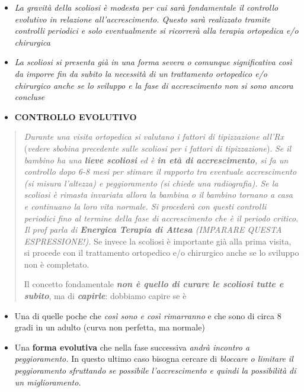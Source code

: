 \documentclass[]{article}
\begin{document}
\begin{itemize}
\item
  \emph{La \emph{gravità} della scoliosi è \emph{modesta} per cui sarà
  fondamentale il \emph{controllo evolutivo} in relazione
  all'accrescimento. Questo sarà realizzato tramite controlli periodici
  e solo \emph{eventualmente} si ricorrerà alla terapia ortopedica e/o
  chirurgica}
\item
  \emph{La \emph{scoliosi} si presenta \emph{già in una forma severa}
  \emph{o} comunque \emph{significativa} così da imporre fin da subito
  la necessità di un trattamento ortopedico e/o chirurgico \emph{anche
  se lo sviluppo e la fase di accrescimento non si sono ancora
  concluse}}
\end{itemize}

\begin{itemize}
\item
  \textbf{CONTROLLO EVOLUTIVO}
\end{itemize}

\begin{quote}
\emph{Durante una visita ortopedica si valutano i fattori di
tipizzazione all'Rx} (\emph{vedere sbobina precedente sulle scoliosi per
i fattori di tipizzazione}). \emph{Se il bambino ha una
\textbf{\emph{lieve scoliosi}} ed è \textbf{\emph{in età di
accrescimento}}, si fa un controllo dopo 6-8 mesi per stimare il
rapporto tra eventuale accrescimento (si misura l'altezza) e
peggioramento (si chiede una radiografia). Se la scoliosi è rimasta
invariata allora la bambina o il bambino tornano a casa e continuano la
loro vita normale. \emph{Si procederà con questi controlli periodici
fino al termine della fase di accrescimento che è il periodo critico}.
Il prof parla di \textbf{Energica Terapia di Attesa} (IMPARARE QUESTA
ESPRESSIONE!).} Se invece la scoliosi è importante già alla prima
visita, si procede con il trattamento ortopedico e/o chirurgico anche se
lo sviluppo non è completato.

Il concetto fondamentale \textbf{\emph{non è quello di curare le
scoliosi tutte e subito}}, ma di \textbf{\emph{capirle}}: dobbiamo
capire se è
\end{quote}

\begin{itemize}
\item
  Una di quelle poche che \emph{così sono e così rimarranno} e che sono
  di circa 8 gradi in un adulto (curva non perfetta, ma normale)
\item
  Una \textbf{forma evolutiva} che nella fase successiva \emph{andrà
  incontro a peggioramento.} In questo ultimo caso bisogna cercare di
  \emph{\emph{bloccare o limitare il peggioramento sfruttando se
  possibile l'accrescimento e quindi la possibilità di un miglioramento.
  }}
\end{itemize}
\end{document}
